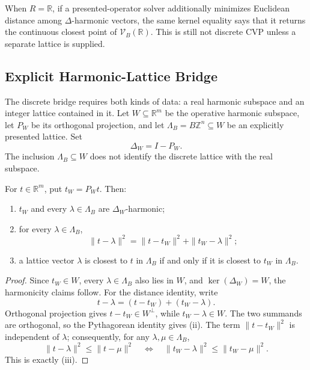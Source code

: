 When \(R=\mathbb R\), if a presented-operator solver additionally minimizes
Euclidean distance among \(\Delta\)-harmonic vectors, the same kernel equality
says that it returns the continuous closest point of \(\mathcal V_B(\mathbb
R)\). This is still not discrete CVP unless a separate lattice is supplied.

\subsection{Explicit Harmonic-Lattice Bridge}

The discrete bridge requires both kinds of data: a real harmonic subspace and
an integer lattice contained in it. Let \(W\subseteq\mathbb R^m\) be the
operative harmonic subspace, let \(P_W\) be its orthogonal projection, and let
\(\Lambda_B=B\mathbb Z^n\subseteq W\) be an explicitly presented lattice. Set
\[
  \Delta_W=I-P_W.
\]
The inclusion \(\Lambda_B\subseteq W\) does not identify the discrete lattice
with the real subspace.

\begin{proposition}\label{prop:hodge-projection-is-cvp}
  For \(t\in\mathbb R^m\), put \(t_W=P_Wt\). Then:
  \begin{enumerate}[label=(\roman*)]
    \item \(t_W\) and every \(\lambda\in\Lambda_B\) are
      \(\Delta_W\)-harmonic;
    \item for every \(\lambda\in\Lambda_B\),
      \[
        \|t-\lambda\|^2
        =
        \|t-t_W\|^2+\|t_W-\lambda\|^2;
      \]
    \item a lattice vector \(\lambda\) is closest to \(t\) in
      \(\Lambda_B\) if and only if it is closest to \(t_W\) in
      \(\Lambda_B\).
  \end{enumerate}
\end{proposition}

\begin{proof}
  Since \(t_W\in W\), every \(\lambda\in\Lambda_B\) also lies in \(W\), and
  \(\ker(\Delta_W)=W\), the harmonicity claims follow. For the distance
  identity, write
  \[
    t-\lambda=(t-t_W)+(t_W-\lambda).
  \]
  Orthogonal projection gives \(t-t_W\in W^\perp\), while
  \(t_W-\lambda\in W\). The two summands are orthogonal, so the Pythagorean
  identity gives (ii). The term \(\|t-t_W\|^2\) is independent of
  \(\lambda\); consequently, for any \(\lambda,\mu\in\Lambda_B\),
  \[
    \|t-\lambda\|^2\le \|t-\mu\|^2
    \quad\Longleftrightarrow\quad
    \|t_W-\lambda\|^2\le \|t_W-\mu\|^2.
  \]
  This is exactly (iii).
\end{proof}

